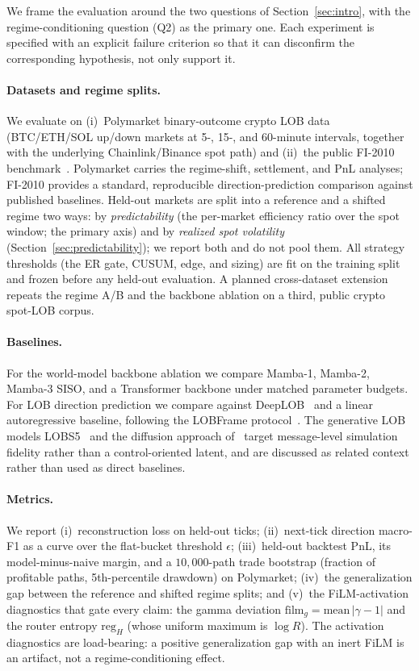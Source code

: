 \documentclass{article}
\begin{document}
We frame the evaluation around the two questions of
Section~\ref{sec:intro}, with the regime-conditioning question
(Q2) as the primary one.  Each experiment is specified with an explicit
failure criterion so that it can disconfirm the corresponding
hypothesis, not only support it.

\paragraph{Datasets and regime splits.}
We evaluate on (i)~Polymarket binary-outcome crypto LOB data (BTC/ETH/SOL
up/down markets at 5-, 15-, and 60-minute intervals, together with the
underlying Chainlink/Binance spot path) and (ii)~the public FI-2010
benchmark~\citep{ntakaris2018benchmark}.  Polymarket carries the
regime-shift, settlement, and PnL analyses; FI-2010 provides a standard,
reproducible direction-prediction comparison against published
baselines.  Held-out markets are split into a reference and a shifted
regime two ways: by \emph{predictability} (the per-market efficiency
ratio over the spot window; the primary axis) and by \emph{realized spot
volatility} (Section~\ref{sec:predictability}); we report both and do not
pool them.  All strategy thresholds (the ER gate, CUSUM, edge, and
sizing) are fit on the training split and frozen before any held-out
evaluation.  A planned cross-dataset extension repeats the regime A/B and
the backbone ablation on a third, public crypto spot-LOB corpus.

\paragraph{Baselines.}
For the world-model backbone ablation we compare Mamba-1, Mamba-2,
Mamba-3 SISO, and a Transformer backbone under matched
parameter budgets.  For LOB direction prediction we compare against
DeepLOB~\citep{zhang2019deeplob} and a linear autoregressive baseline,
following the LOBFrame protocol~\citep{lobframe2024}.  The generative
LOB models LOBS5~\citep{nagy2023lobs5} and the diffusion approach
of~\citet{backhouse2025painting} target message-level simulation fidelity
rather than a control-oriented latent, and are discussed as related
context rather than used as direct baselines.

\paragraph{Metrics.}
We report (i)~reconstruction loss on held-out ticks; (ii)~next-tick
direction macro-F1 as a curve over the flat-bucket threshold $\epsilon$;
(iii)~held-out backtest PnL, its model-minus-naive margin, and a
$10{,}000$-path trade bootstrap (fraction of profitable paths,
5th-percentile drawdown) on Polymarket; (iv)~the generalization gap
between the reference and shifted regime splits; and (v)~the
FiLM-activation diagnostics that gate every claim: the gamma deviation
$\mathrm{film}_g = \mathrm{mean}\,|\gamma - 1|$ and the router entropy
$\mathrm{reg}_H$ (whose uniform maximum is $\log R$).  The activation
diagnostics are load-bearing: a positive generalization gap with an inert
FiLM is an artifact, not a regime-conditioning effect.
\end{document}
